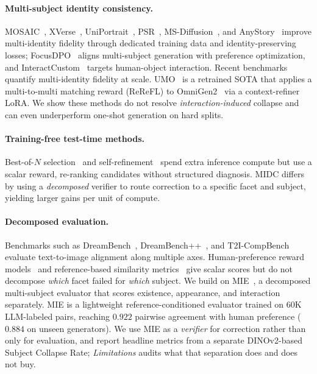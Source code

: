 \documentclass[letterpaper]{article}
\begin{document}
\paragraph{Multi-subject identity consistency.} MOSAIC~\citep{she2025mosaic}, XVerse~\citep{chen2025xverse}, UniPortrait~\citep{he2024uniportrait}, PSR~\citep{wang2025psr}, MS-Diffusion~\citep{wang2024ms}, and AnyStory~\citep{he2025anystory} improve multi-identity fidelity through dedicated training data and identity-preserving losses; FocusDPO~\citep{jin2025focusdpo} aligns multi-subject generation with preference optimization, and InteractCustom~\citep{xu2025interactcustom} targets human-object interaction. Recent benchmarks~\citep{borse2025multihuman,oshima2025multibanana} quantify multi-identity fidelity at scale. UMO~\citep{cheng2025umo} is a retrained SOTA that applies a multi-to-multi matching reward (ReReFL) to OmniGen2~\citep{wu2025omnigen2} via a context-refiner LoRA. We show these methods do not resolve \emph{interaction-induced} collapse and can even underperform one-shot generation on hard splits.

\paragraph{Training-free test-time methods.} Best-of-$N$ selection~\citep{snell2024testtime,cobbe2021gsm8k} and self-refinement~\citep{madaan2023selfrefine} spend extra inference compute but use a scalar reward, re-ranking candidates without structured diagnosis. MIDC differs by using a \emph{decomposed} verifier to route correction to a specific facet and subject, yielding larger gains per unit of compute.

\paragraph{Decomposed evaluation.} Benchmarks such as DreamBench~\citep{ruiz2023dreambooth}, DreamBench++~\citep{peng2024dreambench++}, and T2I-CompBench~\citep{huang2023t2i} evaluate text-to-image alignment along multiple axes. Human-preference reward models~\citep{xu2023imagereward,kirstain2023pick,wu2023human} and reference-based similarity metrics~\citep{radford2021learning,deng2019arcface,wang2004image,hore2010image,wang2003multiscale} give scalar scores but do not decompose \emph{which} facet failed for \emph{which} subject. We build on MIE~\citep{anon2025mibe}, a decomposed multi-subject evaluator that scores existence, appearance, and interaction separately. MIE is a lightweight reference-conditioned evaluator trained on 60K LLM-labeled pairs, reaching $0.922$ pairwise agreement with human preference ($0.884$ on unseen generators). We use MIE as a \emph{verifier} for correction rather than only for evaluation, and report headline metrics from a separate DINOv2-based Subject Collapse Rate; \emph{Limitations} audits what that separation does and does not buy.
\end{document}
